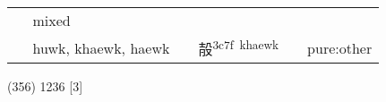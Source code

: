 \documentclass[14pt,a4paper]{scrartcl}
\begin{document}
\begin{longtable}[c]{@{}llllll@{}}
\begin{minipage}[t]{0.14\columnwidth}\raggedright\strut
\strut\end{minipage} &
\begin{minipage}[t]{0.14\columnwidth}\raggedright\strut
mixed
\strut\end{minipage}\tabularnewline
\begin{minipage}[t]{0.14\columnwidth}\raggedright\strut
𡉉
\strut\end{minipage} &
\begin{minipage}[t]{0.14\columnwidth}\raggedright\strut
huwk, khaewk, haewk
\strut\end{minipage} &
\begin{minipage}[t]{0.14\columnwidth}\raggedright\strut
\strut\end{minipage} &
\begin{minipage}[t]{0.14\columnwidth}\raggedright\strut
㱿\textsuperscript{3c7f~khaewk}
\strut\end{minipage} &
\begin{minipage}[t]{0.14\columnwidth}\raggedright\strut
\strut\end{minipage} &
\begin{minipage}[t]{0.14\columnwidth}\raggedright\strut
pure:other
\strut\end{minipage}\tabularnewline
\bottomrule
\end{longtable}

(356) 1236 {[}3{]}
\end{document}
